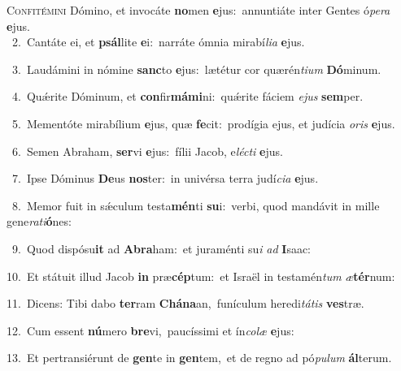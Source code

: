 \lettrine{\initial\textcolor{\initialcolor}{C}}{onfitémini} Dómino, et invocáte \textbf{no}\-men \textbf{e}\-jus:~\star annuntiáte inter Gentes ó\-\textit{pe}\-\textit{ra} \textbf{e}\-jus.\\
{\numbfont\textcolor{\numbcolor}{~2.}}~Cantáte ei, et \textbf{psál}\-lite \textbf{e}\-i:~\star narráte ómnia mirabí\-\textit{li}\-\textit{a} \textbf{e}\-jus.\par
{\numbfont\textcolor{\numbcolor}{~3.}}~Laudámini in nómine \textbf{sanc}\-to \textbf{e}\-jus:~\star lætétur cor quærén\-\textit{ti}\-\textit{um} \textbf{Dó}\-minum.\par
{\numbfont\textcolor{\numbcolor}{~4.}}~Quǽrite Dóminum, et \textbf{con}\-fir\-\textbf{má}\-\textbf{mi}ni:~\star quǽrite fáciem \textit{e}\-\textit{jus} \textbf{sem}\-per.\par
{\numbfont\textcolor{\numbcolor}{~5.}}~Mementóte mirabílium \textbf{e}\-jus, quæ \textbf{fe}\-cit:~\star prodígia ejus, et judícia \textit{o}\-\textit{ris} \textbf{e}\-jus.\par
{\numbfont\textcolor{\numbcolor}{~6.}}~Semen Abraham, \textbf{ser}\-vi \textbf{e}\-jus:~\star fílii Jacob, e\-\textit{léc}\-\textit{ti} \textbf{e}\-jus.\par
{\numbfont\textcolor{\numbcolor}{~7.}}~Ipse Dóminus \textbf{De}\-us \textbf{nos}\-ter:~\star in univérsa terra judí\-\textit{ci}\-\textit{a} \textbf{e}\-jus.\par
{\numbfont\textcolor{\numbcolor}{~8.}}~Memor fuit in sǽculum testa\-\textbf{mén}\-ti \textbf{su}\-i:~\star verbi, quod mandávit in mille gene\-\textit{ra}\-\textit{ti}\textbf{ó}nes:\par
{\numbfont\textcolor{\numbcolor}{~9.}}~Quod dispósu\textbf{it} ad \textbf{A}\-\textbf{bra}ham:~\star et juraménti su\textit{i} \textit{ad} \textbf{I}\-saac:\par
{\numbfont\textcolor{\numbcolor}{10.}}~Et státuit illud Jacob \textbf{in} præ\-\textbf{cép}\-tum:~\star et Israël in testamén\textit{tum} \textit{æ}\-\textbf{tér}num:\par
{\numbfont\textcolor{\numbcolor}{11.}}~Dicens: Tibi dabo \textbf{ter}\-ram \textbf{Chá}\-\textbf{na}an,~\star funículum heredi\-\textit{tá}\-\textit{tis} \textbf{ves}\-træ.\par
{\numbfont\textcolor{\numbcolor}{12.}}~Cum essent \textbf{nú}\-mero \textbf{bre}\-vi,~\star paucíssimi et ín\-\textit{co}\-\textit{læ} \textbf{e}\-jus:\par
{\numbfont\textcolor{\numbcolor}{13.}}~Et pertransiérunt de \textbf{gen}\-te in \textbf{gen}\-tem,~\star et de regno ad pó\-\textit{pu}\-\textit{lum} \textbf{ál}\-terum.\par
